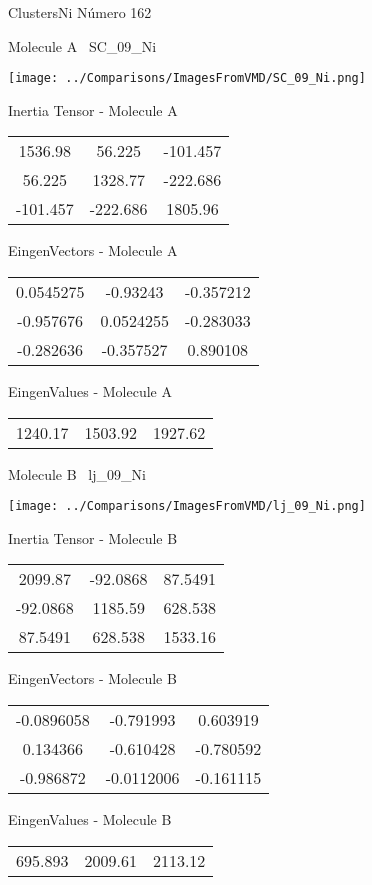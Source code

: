 \vtab[-3cm]
\begin{center}
{\large ClustersNi \tab Número 162}
\end{center}
\begin{multicols}{2}
\begin{center}

Molecule A \
SC\_09\_Ni

\texttt{[image: ../Comparisons/ImagesFromVMD/SC\_09\_Ni.png]}

Inertia Tensor - Molecule A \\
\begin{tabular}{|c c c|}
1536.98	 & 	56.225	 & 	-101.457	 \\
56.225	 & 	1328.77	 & 	-222.686	 \\
-101.457	 & 	-222.686	 & 	1805.96
\end{tabular}

\vtab
 EingenVectors - Molecule A     \\
\begin{tabular}{|c c c|}
0.0545275	 & 	-0.93243	 & 	-0.357212	 \\
-0.957676	 & 	0.0524255	 & 	-0.283033	 \\
-0.282636	 & 	-0.357527	 & 	0.890108
\end{tabular}

\vtab
 EingenValues - Molecule A     \\
\begin{tabular}{|c c c|}
1240.17	 & 	1503.92	 & 	1927.62	 \\
\end{tabular}
\columnbreak

Molecule B \
lj\_09\_Ni

\texttt{[image: ../Comparisons/ImagesFromVMD/lj\_09\_Ni.png]}

Inertia Tensor - Molecule B \\
\begin{tabular}{|c c c|}
2099.87	 & 	-92.0868	 & 	87.5491	 \\
-92.0868	 & 	1185.59	 & 	628.538	 \\
87.5491	 & 	628.538	 & 	1533.16
\end{tabular}

\vtab
 EingenVectors - Molecule B     \\
\begin{tabular}{|c c c|}
-0.0896058	 & 	-0.791993	 & 	0.603919	 \\
0.134366	 & 	-0.610428	 & 	-0.780592	 \\
-0.986872	 & 	-0.0112006	 & 	-0.161115
\end{tabular}

\vtab
 EingenValues - Molecule B     \\
\begin{tabular}{|c c c|}
695.893	 & 	2009.61	 & 	2113.12	 \\
\end{tabular}

\end{center}
\end{multicols}

